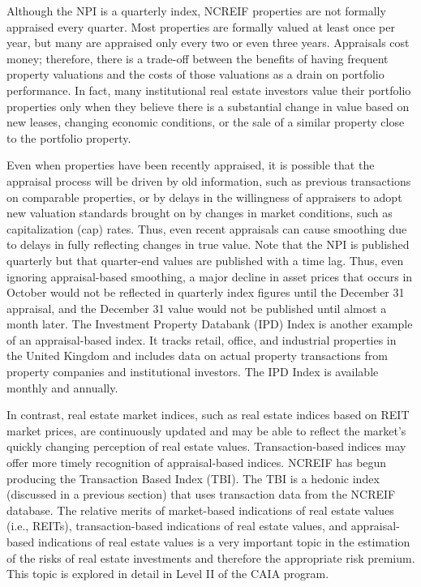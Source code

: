 \documentclass[11pt]{article}
\begin{document}
Although the NPI is a quarterly index, NCREIF properties are not formally appraised every quarter. Most properties are formally valued at least once per year, but many are appraised only every two or even three years. Appraisals cost money; therefore, there is a trade-off between the benefits of having frequent property valuations and the costs of those valuations as a drain on portfolio performance. In fact, many institutional real estate investors value their portfolio properties only when they believe there is a substantial change in value based on new leases, changing economic conditions, or the sale of a similar property close to the portfolio property.

Even when properties have been recently appraised, it is possible that the appraisal process will be driven by old information, such as previous transactions on comparable properties, or by delays in the willingness of appraisers to adopt new valuation standards brought on by changes in market conditions, such as capitalization (cap) rates. Thus, even recent appraisals can cause smoothing due to delays in fully reflecting changes in true value. Note that the NPI is published quarterly but that quarter-end values are published with a time lag. Thus, even ignoring appraisal-based smoothing, a major decline in asset prices that occurs in October would not be reflected in quarterly index figures until the December 31 appraisal, and the December 31 value would not be published until almost a month later. The Investment Property Databank (IPD) Index is another example of an appraisal-based index. It tracks retail, office, and industrial properties in the United Kingdom and includes data on actual property transactions from property companies and institutional investors. The IPD Index is available monthly and annually.

In contrast, real estate market indices, such as real estate indices based on REIT market prices, are continuously updated and may be able to reflect the market's quickly changing perception of real estate values. Transaction-based indices may offer more timely recognition of appraisal-based indices. NCREIF has begun producing the Transaction Based Index (TBI). The TBI is a hedonic index (discussed in a previous section) that uses transaction data from the NCREIF database. The relative merits of market-based indications of real estate values (i.e., REITs), transaction-based indications of real estate values, and appraisal-based indications of real estate values is a very important topic in the estimation of the risks of real estate investments and therefore the appropriate risk premium. This topic is explored in detail in Level II of the CAIA program.
\end{document}
